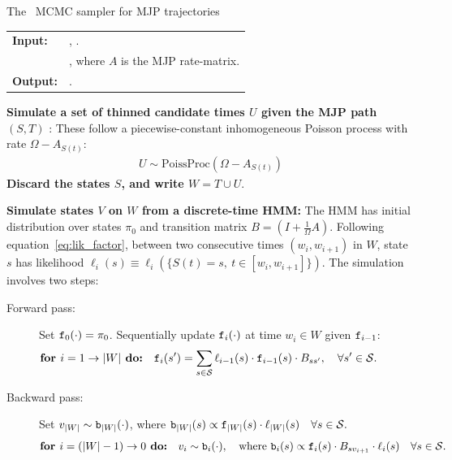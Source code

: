 \begin{algorithm}[H]
  \caption{The~\cite{RaoTeh13} MCMC sampler for MJP trajectories}
   \label{alg:Unif_gibbs}
  \begin{tabular}{l l}
   \textbf{Input:  } & \text{Prior $\pi_0$, observations $X$}, 
                       \text{the previous path $S(t) = (S, T)$}.\\ 
                     & \text{Parameter $\Omega > \max_i A_i$}, where
   $A$ is the MJP rate-matrix.\\
   \textbf{Output:  }& \text{New MJP trajectory $S' (t) = (S', T')$}.\\
   \hline
   \end{tabular}
   \begin{algorithmic}[1]
\State \textbf{ Simulate a set of thinned candidate times $U$ given the MJP path $(S,T)$ }: 
These follow a piecewise-constant inhomogeneous Poisson process with rate $\Omega-A_{S(t)}$: 
\begin{align*}
  U \sim \text{PoissProc}(\Omega - A_{S(t)}) 
\end{align*}
\State \textbf{
  Discard the states $S$, and write %
  $W = T \cup U$}.

\State \textbf{ Simulate states $V$ on $W$ from a discrete-time HMM:} 
The HMM has initial distribution over states $\pi_0$ and transition matrix $B = \left(I+\frac{1}{\Omega}A\right)$.
 Following equation~\eqref{eq:lik_factor}, between two consecutive times $(w_i,w_{i+1})$ in $W$, state $s$ has 
likelihood $\ell_i(s) \equiv \ell_i(\{S(t) = s,\ t \in [w_i,w_{i+1}]\})$. The simulation involves two steps: 
\begin{description}
  \item[Forward pass:] 
    Set $\mathtt{f}_0(\cdot) = \pi_0$.
    Sequentially update $\mathtt{f}_i(\cdot)$ at time $w_i \in W$ given $\mathtt{f}_{i-1}$: 
    $$\textbf{for } i=1\rightarrow |W|\textbf{ do:} \quad \mathtt{f}_i(s') = \sum_{s \in {\mathcal S}} \ell_{i-1}(s) \cdot \mathtt{f}_{i-1}(s)\cdot B_{ss'}, \quad \forall s' \in {\mathcal S}.\qquad\qquad\quad $$
  \item[Backward pass:]
    Set $v_{|W|} \sim \mathtt{b}_{|W|}(\cdot)$, where $\mathtt{b}_{|W|}(s) \propto \mathtt{f}_{|W|}(s)\cdot\ell_{|W|}(s) \quad \forall s \in {\mathcal S}.$ 
    $$ \textbf{for } i=(|W|-1)\rightarrow 0\textbf{ do:} \quad v_i \sim \mathtt{b}_i(\cdot),\quad \text{where } 
    \mathtt{b}_i(s) \propto \mathtt{f}_i(s)\cdot B_{sv_{i+1}} \cdot \ell_i(s)  \quad \forall s \in {\mathcal S}.$$
    

\end{description}
\end{algorithmic}
\end{algorithm}
